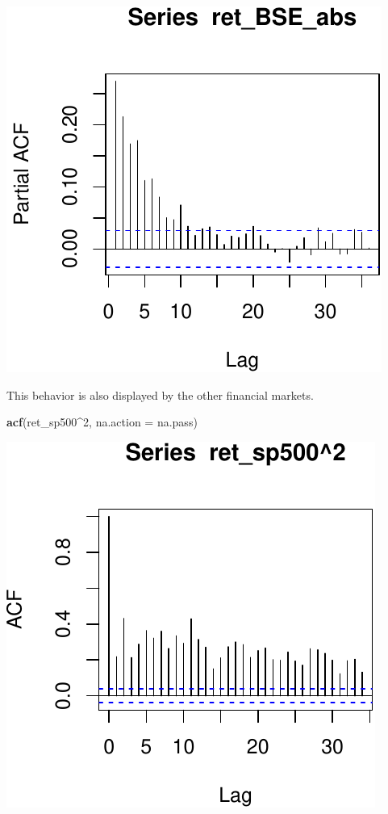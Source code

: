 \documentclass[11pt,]{article}
\newenvironment{Shaded}{\begin{snugshade}}{\end{snugshade}}
\newcommand{\KeywordTok}[1]{\textcolor[rgb]{0.13,0.29,0.53}{\textbf{#1}}}
\newcommand{\DataTypeTok}[1]{\textcolor[rgb]{0.13,0.29,0.53}{#1}}
\newcommand{\DecValTok}[1]{\textcolor[rgb]{0.00,0.00,0.81}{#1}}
\newcommand{\OperatorTok}[1]{\textcolor[rgb]{0.81,0.36,0.00}{\textbf{#1}}}
\newcommand{\NormalTok}[1]{#1}
\begin{document}
\begin{center}\includegraphics{FMC_T4_PhD_ARMA_GARCH_files/figure-latex/BSE_ret_ACF_sq-4} \end{center}

This behavior is also displayed by the other financial markets.

\begin{Shaded}
\begin{Highlighting}[]
\KeywordTok{acf}\NormalTok{(ret_sp500}\OperatorTok{^}\DecValTok{2}\NormalTok{, }\DataTypeTok{na.action =}\NormalTok{ na.pass)}
\end{Highlighting}
\end{Shaded}

\begin{center}\includegraphics{FMC_T4_PhD_ARMA_GARCH_files/figure-latex/ret_ind_ACF_sq-1} \end{center}
\end{document}
